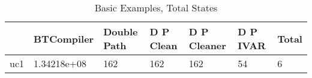 \begin{table}
\centering
\caption{Basic Examples, Total States}
\label{b_e_total}
\begin{tabular}{lllllll}
\toprule
{} &   BTCompiler & Double Path & D P Clean & D P Cleaner & D P IVAR & Total \\
\midrule
uc1 &  1.34218e+08 &         162 &       162 &         162 &       54 &     6 \\
\bottomrule
\end{tabular}
\end{table}
